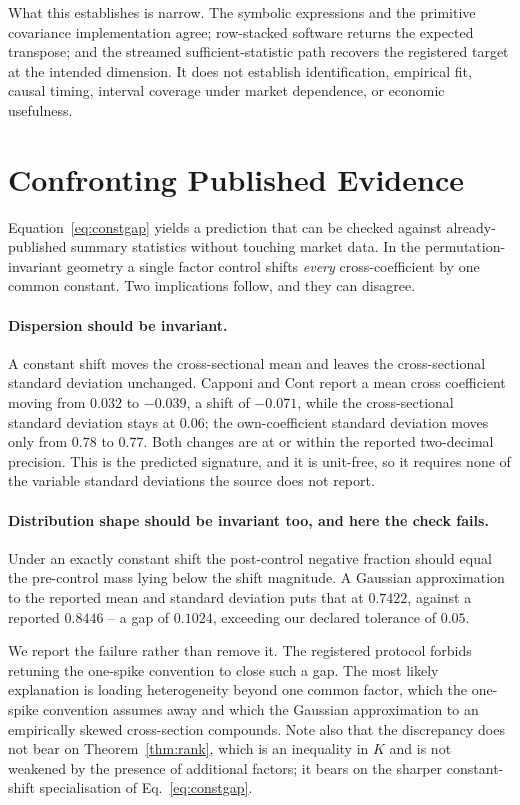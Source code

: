 \documentclass[10pt,twocolumn]{article}
\theoremstyle{remark}
\begin{document}
What this establishes is narrow. The symbolic expressions and the primitive
covariance implementation agree; row-stacked software returns the expected
transpose; and the streamed sufficient-statistic path recovers the registered
target at the intended dimension. It does not establish identification,
empirical fit, causal timing, interval coverage under market dependence, or
economic usefulness.

\section{Confronting Published Evidence}
\label{sec:published}

Equation~\eqref{eq:constgap} yields a prediction that can be checked against
already-published summary statistics without touching market data. In the
permutation-invariant geometry a single factor control shifts \emph{every}
cross-coefficient by one common constant. Two implications follow, and they can
disagree.

\paragraph{Dispersion should be invariant.} A constant shift moves the
cross-sectional mean and leaves the cross-sectional standard deviation
unchanged. Capponi and Cont \cite{CapponiCont2020} report a mean cross
coefficient moving from $0.032$ to $-0.039$, a shift of $-0.071$, while the
cross-sectional standard deviation stays at $0.06$; the own-coefficient
standard deviation moves only from $0.78$ to $0.77$. Both changes are at or
within the reported two-decimal precision. This is the predicted signature, and
it is unit-free, so it requires none of the variable standard deviations the
source does not report.

\paragraph{Distribution shape should be invariant too, and here the check
fails.} Under an exactly constant shift the post-control negative fraction
should equal the pre-control mass lying below the shift magnitude. A Gaussian
approximation to the reported mean and standard deviation puts that at
$0.7422$, against a reported $0.8446$ -- a gap of $0.1024$, exceeding our
declared tolerance of $0.05$.

We report the failure rather than remove it. The registered protocol forbids
retuning the one-spike convention to close such a gap. The most likely
explanation is loading heterogeneity beyond one common factor, which the
one-spike convention assumes away and which the Gaussian approximation to an
empirically skewed cross-section compounds. Note also that the discrepancy does
not bear on Theorem~\ref{thm:rank}, which is an inequality in $K$ and is not
weakened by the presence of additional factors; it bears on the sharper
constant-shift specialisation of Eq.~\eqref{eq:constgap}.
\end{document}
